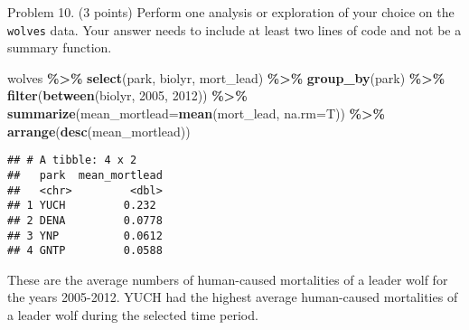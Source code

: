 \documentclass[
]{article}
\newenvironment{Shaded}{\begin{snugshade}}{\end{snugshade}}
\newcommand{\AttributeTok}[1]{\textcolor[rgb]{0.13,0.29,0.53}{#1}}
\newcommand{\DecValTok}[1]{\textcolor[rgb]{0.00,0.00,0.81}{#1}}
\newcommand{\FunctionTok}[1]{\textcolor[rgb]{0.13,0.29,0.53}{\textbf{#1}}}
\newcommand{\NormalTok}[1]{#1}
\newcommand{\SpecialCharTok}[1]{\textcolor[rgb]{0.81,0.36,0.00}{\textbf{#1}}}
\begin{document}
Problem 10. (3 points) Perform one analysis or exploration of your
choice on the \texttt{wolves} data. Your answer needs to include at
least two lines of code and not be a summary function.

\begin{Shaded}
\begin{Highlighting}[]
\NormalTok{wolves }\SpecialCharTok{\%\textgreater{}\%}
  \FunctionTok{select}\NormalTok{(park, biolyr, mort\_lead) }\SpecialCharTok{\%\textgreater{}\%}
  \FunctionTok{group\_by}\NormalTok{(park) }\SpecialCharTok{\%\textgreater{}\%}
  \FunctionTok{filter}\NormalTok{(}\FunctionTok{between}\NormalTok{(biolyr, }\DecValTok{2005}\NormalTok{, }\DecValTok{2012}\NormalTok{)) }\SpecialCharTok{\%\textgreater{}\%}
  \FunctionTok{summarize}\NormalTok{(}\AttributeTok{mean\_mortlead=}\FunctionTok{mean}\NormalTok{(mort\_lead, }\AttributeTok{na.rm=}\NormalTok{T)) }\SpecialCharTok{\%\textgreater{}\%}
  \FunctionTok{arrange}\NormalTok{(}\FunctionTok{desc}\NormalTok{(mean\_mortlead))}
\end{Highlighting}
\end{Shaded}

\begin{verbatim}
## # A tibble: 4 x 2
##   park  mean_mortlead
##   <chr>         <dbl>
## 1 YUCH         0.232 
## 2 DENA         0.0778
## 3 YNP          0.0612
## 4 GNTP         0.0588
\end{verbatim}

These are the average numbers of human-caused mortalities of a leader
wolf for the years 2005-2012. YUCH had the highest average human-caused
mortalities of a leader wolf during the selected time period.
\end{document}
